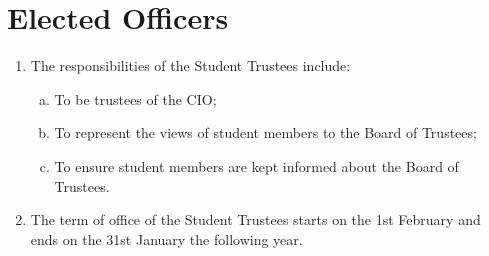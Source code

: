 \documentclass[12pt]{article}
\begin{document}
\section{Elected Officers}
\begin{enumerate}
    \subsection{Student Trustees}
    \item The responsibilities of the Student Trustees include:
    \begin{enumerate}[(a)]
        \item To be trustees of the CIO;
        \item To represent the views of student members to the Board of Trustees;
        \item To ensure student members are kept informed about the Board of Trustees.
    \end{enumerate}
    \item The term of office of the Student Trustees starts on the 1st February and ends on the 31st January the following year.
\end{enumerate}
\end{document}
